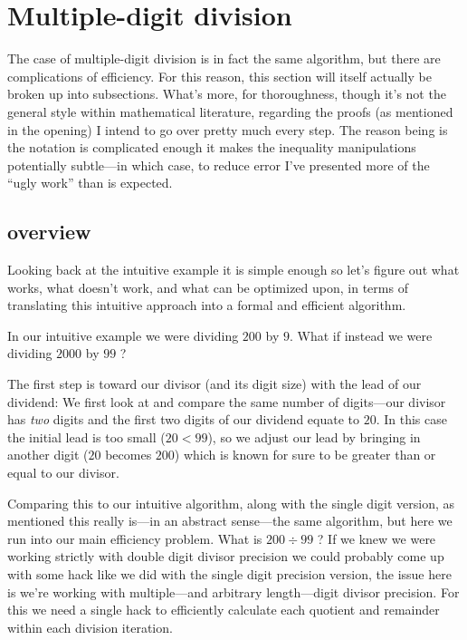 \documentclass[twoside]{article}
\begin{document}
\section*{Multiple-digit division}

The case of multiple-digit division is in fact the same algorithm, but there are complications of efficiency.
For this reason, this section will itself actually be broken up into subsections. What's more, for thoroughness,
though it's not the general style within mathematical literature, regarding the proofs (as mentioned in the opening)
I intend to go over pretty much every step. The reason being is the notation is complicated enough it makes the inequality
manipulations potentially subtle---in which case, to reduce error I've presented more of the ``ugly work'' than is expected.

\subsection*{overview}

Looking back at the intuitive example it is simple enough so let's figure out what works, what doesn't work,
and what can be optimized upon, in terms of translating this intuitive approach into a formal and efficient algorithm.

In our intuitive example we were dividing $ 200 $ by $ 9 $. What if instead we were dividing $ 2000 $ by $ 99 $ ?

The first step is toward our divisor (and its digit size) with the lead of our dividend: We first look at and compare
the same number of digits---our divisor has \emph{two} digits and the first two digits of our dividend equate to $ 20 $.
In this case the initial lead is too small ($ 20 < 99 $), so we adjust our lead by bringing in another digit ($ 20 $ becomes $ 200 $)
which is known for sure to be greater than or equal to our divisor.

Comparing this to our intuitive algorithm, along with the single digit version, as mentioned this really is---in an abstract
sense---the same algorithm, but here we run into our main efficiency problem. What is $ 200\div 99 $ ? If we knew we were working
strictly with double digit divisor precision we could probably come up with some hack like we did with the single digit precision
version, the issue here is we're working with multiple---and arbitrary length---digit divisor precision. For this we need a single
hack to efficiently calculate each quotient and remainder within each division iteration.
\end{document}
